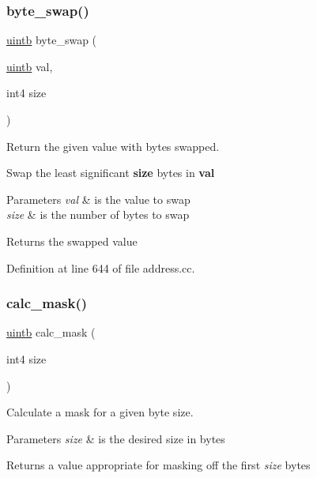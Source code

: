 \subsubsection{\texorpdfstring{byte\_swap()}{byte\_swap()}\hspace{0.1cm}{\footnotesize\ttfamily [2/2]}}
{\footnotesize\ttfamily \mbox{\hyperlink{types_8h_a2db313c5d32a12b01d26ac9b3bca178f}{uintb}} byte\+\_\+swap (\begin{DoxyParamCaption}\item[{\mbox{\hyperlink{types_8h_a2db313c5d32a12b01d26ac9b3bca178f}{uintb}}}]{val,  }\item[{int4}]{size }\end{DoxyParamCaption})}



Return the given value with bytes swapped. 

Swap the least significant {\bfseries{size}} bytes in {\bfseries{val}} 
\begin{DoxyParams}{Parameters}
{\em val} & is the value to swap \\
\hline
{\em size} & is the number of bytes to swap \\
\hline
\end{DoxyParams}
\begin{DoxyReturn}{Returns}
the swapped value 
\end{DoxyReturn}


Definition at line 644 of file address.\+cc.

\mbox{\label{address_8hh_aae7b27e228c11138200b27f02831fc00}} 
\subsubsection{\texorpdfstring{calc\_mask()}{calc\_mask()}}
{\footnotesize\ttfamily \mbox{\hyperlink{types_8h_a2db313c5d32a12b01d26ac9b3bca178f}{uintb}} calc\+\_\+mask (\begin{DoxyParamCaption}\item[{int4}]{size }\end{DoxyParamCaption})\hspace{0.3cm}{\ttfamily [inline]}}



Calculate a mask for a given byte size. 


\begin{DoxyParams}{Parameters}
{\em size} & is the desired size in bytes \\
\hline
\end{DoxyParams}
\begin{DoxyReturn}{Returns}
a value appropriate for masking off the first {\itshape size} bytes 
\end{DoxyReturn}


